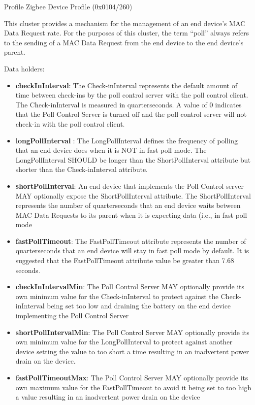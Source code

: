 Profile Zigbee Device Profile (0x0104/260)

This cluster provides a mechanism for the management of an end device’s MAC Data Request rate. For the purposes of this cluster, the term “poll” always refers to the sending of a MAC Data Request from the end device to the end device’s parent.
\newline

\noindent
Data holders:

\begin{itemize}
\item \textbf{checkInInterval}: The Check-inInterval represents the default amount of time between check-ins by the poll control server with the poll control client. The Check-inInterval is measured in quarterseconds. A value of 0 indicates that the Poll Control Server is turned off and the poll control server will not check-in with the poll control client.
\item \textbf{longPollInterval    }: The LongPollInterval defines the frequency of polling that an end device does when it is NOT in fast poll mode. The LongPollInterval SHOULD be longer than the ShortPollInterval attribute but shorter than the Check-inInterval attribute.
\item \textbf{shortPollInterval}: An end device that implements the Poll Control server MAY optionally expose the ShortPollInterval attribute. The ShortPollInterval represents the number of quarterseconds that an end device waits between MAC Data Requests to its parent when it is expecting data (i.e., in fast poll mode
\item \textbf{fastPollTimeout}:     The FastPollTimeout attribute represents the number of quarterseconds that an end device will stay in fast poll mode by default. It is suggested that the FastPollTimeout attribute value be greater than 7.68 seconds.
\item \textbf{checkInIntervalMin}: The Poll Control Server MAY optionally provide its own minimum value for the Check-inInterval to protect against the Check-inInterval being set too low and draining the battery on the end device implementing the Poll Control Server
\item \textbf{shortPollIntervalMin}: The Poll Control Server MAY optionally provide its own minimum value for the LongPollInterval to protect against another device setting the value to too short a time resulting in an inadvertent power drain on the device.
\item \textbf{fastPollTimeoutMax}: The Poll Control Server MAY optionally provide its own maximum value for the FastPollTimeout to avoid it being set to too high a value resulting in an inadvertent power drain on the device
\end{itemize}

